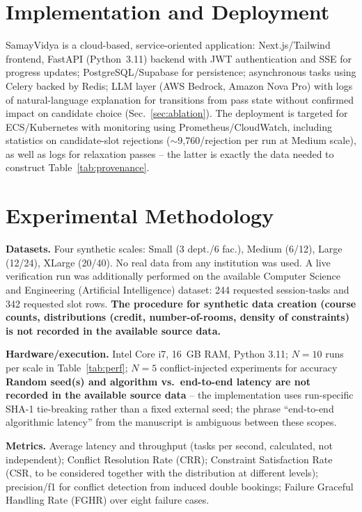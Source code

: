 \documentclass[conference]{IEEEtran}
\begin{document}
\section{Implementation and Deployment}
SamayVidya is a cloud-based, service-oriented application: Next.js/Tailwind frontend, FastAPI (Python~3.11) backend with JWT authentication and SSE for progress updates; PostgreSQL/Supabase for persistence; asynchronous tasks using Celery backed by Redis; LLM layer (AWS Bedrock, Amazon Nova Pro) with logs of natural-language explanation for transitions from pass state without confirmed impact on candidate choice (Sec.~\ref{sec:ablation}). The deployment is targeted for ECS/Kubernetes with monitoring using Prometheus/CloudWatch, including statistics on candidate-slot rejections ($\sim$9{,}760/rejection per run at Medium scale), as well as logs for relaxation passes -- the latter is exactly the data needed to construct Table~\ref{tab:provenance}.

\section{Experimental Methodology}
\label{sec:expmethod}
\textbf{Datasets.} Four synthetic scales: Small (3 dept./6 fac.), Medium (6/12), Large (12/24), XLarge (20/40). No real data from any institution was used. A live verification run was additionally performed on the available Computer Science and Engineering (Artificial Intelligence) dataset: 244 requested session-tasks and 342 requested slot rows. \textbf{The procedure for synthetic data creation (course counts, distributions (credit, number-of-rooms, density of constraints) is not recorded in the available source data.}

\textbf{Hardware/execution.} Intel Core i7, 16~GB RAM, Python 3.11; $N=10$ runs per scale in Table~\ref{tab:perf}; $N=5$ conflict-injected experiments for accuracy \textbf{Random seed(s) and algorithm vs.\ end-to-end latency are not recorded in the available source data} -- the implementation uses run-specific SHA-1 tie-breaking rather than a fixed external seed; the phrase ``end-to-end algorithmic latency'' from the manuscript is ambiguous between these scopes.

\textbf{Metrics.} Average latency and throughput (tasks per second, calculated, not independent); Conflict Resolution Rate (CRR); Constraint Satisfaction Rate (CSR, to be considered together with the distribution at different levels); precision/f1 for conflict detection from induced double bookings; Failure Graceful Handling Rate (FGHR) over eight failure cases.
\end{document}

